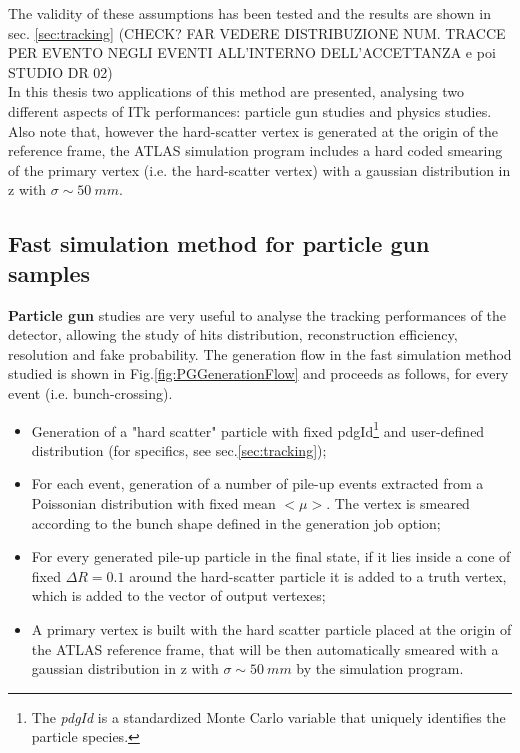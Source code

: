 \documentclass[a4paper,twoside,12pt]{article}
\begin{document}
The validity of these assumptions has been tested and the results are shown in sec.
\ref{sec:tracking} (CHECK? FAR VEDERE DISTRIBUZIONE NUM. TRACCE PER EVENTO 
NEGLI EVENTI ALL'INTERNO DELL'ACCETTANZA e poi STUDIO DR 02)\\

In this thesis two applications of this method are presented, analysing two different aspects
of ITk performances: particle gun studies and physics studies. \\

Also note that, however the hard-scatter vertex is generated at the origin of the reference
frame, the ATLAS simulation program includes a hard coded smearing of the primary vertex
(i.e. the hard-scatter vertex) with a gaussian distribution in z with $\sigma \sim 50\ mm$.

\subsection{Fast simulation method for particle gun samples}

\textbf{Particle gun} studies are very useful to analyse the tracking performances of the
detector, allowing the study of hits distribution, reconstruction efficiency, resolution and
fake probability. The generation flow in the fast simulation method studied is shown in Fig.\ref{fig:PGGenerationFlow} and proceeds as follows,
for every event (i.e. bunch-crossing).\\
\begin{itemize}
\item Generation of a "hard scatter" particle with fixed pdgId\footnote{The \textit{pdgId} 
is a standardized Monte Carlo variable that uniquely identifies the particle species.} and 
user-defined distribution (for specifics, see sec.\ref{sec:tracking});
\item For each event, generation of a number of pile-up events extracted from a Poissonian
distribution with fixed mean $<\mu>$. The vertex is smeared according to the bunch shape
defined in the generation job option;
\item For every generated pile-up particle in the final state, if it lies inside a cone of fixed
$\Delta R = 0.1$ around the hard-scatter particle it is added to a truth vertex, which is added to the vector of output vertexes;
\item A primary vertex is built with the hard scatter particle placed at the origin of the
ATLAS reference frame, that will be then automatically smeared with a gaussian distribution
in z with $\sigma \sim 50\ mm$ by the simulation program.
\end{itemize}
\end{document}
